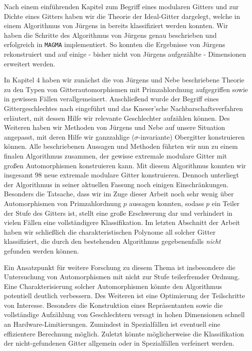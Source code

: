 \documentclass[12pt,a4paper,halfparskip,headsepline,bibtotocnumbered]{scrreprt}
\theoremstyle{nummermitklammern}
\theoremstyle{nonumberbreak}
\begin{document}
Nach einem einführenden Kapitel zum Begriff eines modularen Gitters und zur Dichte eines Gitters haben wir die Theorie der Ideal-Gitter dargelegt, welche in einem Algorithmus von Jürgens in \cite{juergens} bereits klassifiziert werden konnten. Wir haben die Schritte des Algorithmus von Jürgens genau beschrieben und erfolgreich in \texttt{MAGMA} implementiert. So konnten die Ergebnisse von Jürgens rekonstruiert und auf einige - bisher nicht von Jürgens aufgezählte - Dimensionen erweitert werden.\par
In Kapitel $4$ haben wir zunächst die von Jürgens und Nebe beschriebene Theorie zu den Typen von Gitterautomorphismen mit Primzahlordnung aufgegriffen sowie in gewissen Fällen verallgemeinert. Anschließend wurde der Begriff eines Gittergeschlechtes nach \cite{conway} eingeführt und das Kneser'sche Nachbarschaftsverfahren erläutert, mit dessen Hilfe wir relevante Geschlechter aufzählen können. Des Weiteren haben wir Methoden von Jürgens und Nebe auf unsere Situation angepasst, mit deren Hilfe wir ganzzahlige ($\sigma$-invariante) Obergitter konstruieren können. Alle beschriebenen Aussagen und Methoden führten wir nun zu einem finalen Algorithmus zusammen, der gewisse extremale modulare Gitter mit großen Automorphismen konstruieren kann. Mit diesem Algorithmus konnten wir insgesamt $98$ neue extremale modulare Gitter konstruieren. Dennoch unterliegt der Algorithmus in seiner aktuellen Fassung noch einigen Einschränkungen. Besonders die Tatsache, dass wir im Zuge dieser Arbeit noch sehr wenig über Automorphismen von Primzahlordnung $p$ aussagen konnten, sodass $p$ ein Teiler der Stufe des Gitters ist, stellt eine große Erschwerung dar und verhindert in vielen Fällen eine vollständigere Klassifikation. Im letzten Abschnitt der Arbeit haben wir schließlich die charakteristischen Polynome all solcher Gitter klassifiziert, die durch den bestehenden Algorithmus gegebenenfalls \textit{nicht} gefunden werden können.\par
Ein Ansatzpunkt für weitere Forschung zu diesem Thema ist insbesondere die Untersuchung von Automorphismen mit nicht zur Stufe teilerfremder Ordnung.  Eine Charakterisierung solcher Automorphismen könnte den Algorithmus potentiell deutlich verbessern. Des Weiteren ist eine Optimierung der Teilschritte von Interesse. Besonders die Konstruktion eines Repräsentanten sowie die vollständige Aufzählung von Geschlechtern versagt in hohen Dimensionen schnell an Hardware-Limitierungen. Zumindest in Spezialfällen ist eventuell eine effizientere Berechnung möglich. Zuletzt könnte möglicherweise die Klassifikation der nicht-gefundenen Gitter allgemein oder in Spezialfällen verfeinert werden. 
\end{document}
